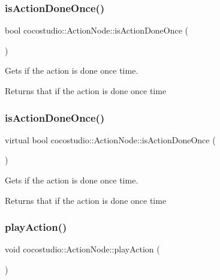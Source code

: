 \subsubsection{\texorpdfstring{is\+Action\+Done\+Once()}{isActionDoneOnce()}\hspace{0.1cm}{\footnotesize\ttfamily [1/2]}}
{\footnotesize\ttfamily bool cocostudio\+::\+Action\+Node\+::is\+Action\+Done\+Once (\begin{DoxyParamCaption}{ }\end{DoxyParamCaption})\hspace{0.3cm}{\ttfamily [virtual]}}

Gets if the action is done once time.

\begin{DoxyReturn}{Returns}
that if the action is done once time 
\end{DoxyReturn}
\mbox{\label{classcocostudio_1_1ActionNode_acbb8ef4826226220698b4d0a13d9f835}} 
\subsubsection{\texorpdfstring{is\+Action\+Done\+Once()}{isActionDoneOnce()}\hspace{0.1cm}{\footnotesize\ttfamily [2/2]}}
{\footnotesize\ttfamily virtual bool cocostudio\+::\+Action\+Node\+::is\+Action\+Done\+Once (\begin{DoxyParamCaption}{ }\end{DoxyParamCaption})\hspace{0.3cm}{\ttfamily [virtual]}}

Gets if the action is done once time.

\begin{DoxyReturn}{Returns}
that if the action is done once time 
\end{DoxyReturn}
\mbox{\label{classcocostudio_1_1ActionNode_ad5f59a7173fe2672eaa54c06397ad2f0}} 
\subsubsection{\texorpdfstring{play\+Action()}{playAction()}\hspace{0.1cm}{\footnotesize\ttfamily [1/2]}}
{\footnotesize\ttfamily void cocostudio\+::\+Action\+Node\+::play\+Action (\begin{DoxyParamCaption}{ }\end{DoxyParamCaption})\hspace{0.3cm}{\ttfamily [virtual]}}

